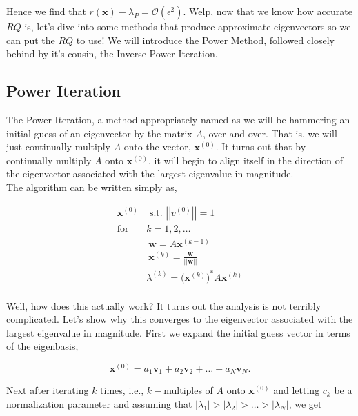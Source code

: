 \documentclass[paper=a4, fontsize=11pt]{scrartcl} %
\numberwithin{equation}{section} %
\numberwithin{figure}{section} %
\numberwithin{table}{section} %
\begin{document}
Hence we find that $r(\textbf{x}) - \lambda_P = \mathcal{O}(\epsilon^2).$ Welp, now that we know how accurate $RQ$ is, let's dive into some methods that produce approximate eigenvectors so we can put the $RQ$ to use! We will introduce the Power Method, followed closely behind by it's cousin, the Inverse Power Iteration. 



%
%
\subsection{Power Iteration}

The Power Iteration, a method appropriately named as we will be hammering an initial guess of an eigenvector by the matrix $A$, over and over. That is, we will just continually multiply $A$ onto the vector, $\textbf{x}^{(0)}$. It turns out that by continually multiply $A$ onto $\textbf{x}^{(0)}$,  it will begin to align itself in the direction of the eigenvector associated with the largest eigenvalue in magnitude. \\

The algorithm can be written simply as, 

\begin{align*}
\textbf{x}^{(0)} &\mbox{ s.t. } \left|\left|v^{(0)}\right|\right| = 1 \\ 
\mbox{for } &k=1,2,\ldots \\
\ \ \ \ &\ \textbf{w} = A\textbf{x}^{(k-1)} \\
\ \ \ \ &\ \textbf{x}^{(k)} = \frac{ \textbf{w} } { \left|\left| \textbf{w} \right|\right| } \\
\ \ \ \ &\lambda^{(k)} = \bigg( \textbf{x}^{(k)} \bigg)^{*} A \textbf{x}^{(k)} \\
\end{align*}

Well, how does this actually work? It turns out the analysis is not terribly complicated. Let's show why this converges to the eigenvector associated with the largest eigenvalue in magnitude. First we expand the initial guess vector in terms of the eigenbasis,

$$\textbf{x}^{(0)} = a_1 \textbf{v}_1 + a_2 \textbf{v}_2 + \ldots + a_N \textbf{v}_N.$$

Next after iterating $k$ times, i.e., $k-$multiples of $A$ onto $\textbf{x}^{(0)}$ and letting $c_k$ be a normalization parameter and assuming that $\left| \lambda_1 \right| > \left| \lambda_2 \right| >\ldots> \left| \lambda_N \right|$, we get
\end{document}
